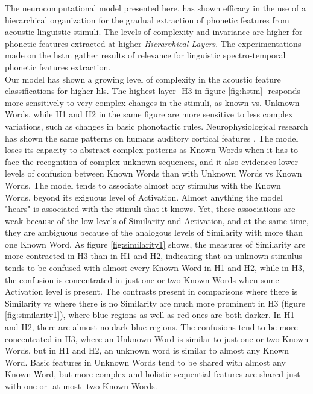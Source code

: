 \documentclass[11pt,a4paper]{article}
\begin{document}
The neurocomputational model presented here, has shown efficacy in the
use of a hierarchical organization for the gradual extraction
of phonetic features from acoustic linguistic stimuli.
The levels of complexity and invariance are higher for phonetic features
extracted at higher \textit{Hierarchical Layers}.
The experimentations made on the \ac{hstm} gather results of relevance
for linguistic spectro-temporal phonetic features extraction.\\

Our model has shown a growing level of complexity in the
acoustic feature classifications for higher \ac{hl}s.
The highest layer -H3 in figure \ref{fig:hstm}-
responds more sensitively to very complex changes in the stimuli,
as known vs. Unknown Words, while H1 and H2 in the same figure
are more sensitive to less complex variations, such as changes in
basic phonotactic rules.
Neurophysiological research has shown the same patterns
on humans auditory cortical features \cite{okada10, humphries14, wessinger01}.
The model loses its capacity to abstract complex patterns as Known Words
when it has to face the recognition of complex unknown sequences,
and it also evidences lower levels of confusion between Known Words
than with Unknown Words vs Known Words.
The model tends to associate almost any stimulus with the Known
Words, beyond its exiguous level of Activation.
Almost anything the model "hears" is associated with the stimuli that
it knows. Yet, these associations are weak because
of the low levels of Similarity and Activation,
and at the same time, they are ambiguous because of the
analogous levels of Similarity with more than one Known Word.
As figure \ref{fig:similarity1} shows, the measures of Similarity are
more contracted in H3 than in H1 and H2, indicating that an
unknown stimulus tends to be confused with almost every Known Word
in H1 and H2, while in H3, the confusion is concentrated in just one
or two Known Words when some Activation level is present.
The contrasts present in comparisons
where there is Similarity vs where there is no Similarity
are much more prominent in H3 (figure \ref{fig:similarity1}),
where blue regions as well as red ones are both darker.
In H1 and H2, there are almost no dark blue regions.
The confusions tend to be more concentrated in H3, where an
Unknown Word is similar to just one or two Known Words,
but in H1 and H2, an unknown word is similar to almost
any Known Word.
Basic features in Unknown Words tend to be shared with almost
any Known Word, but more complex and holistic sequential
features are shared just with one or -at most- two Known Words.\\
\end{document}
